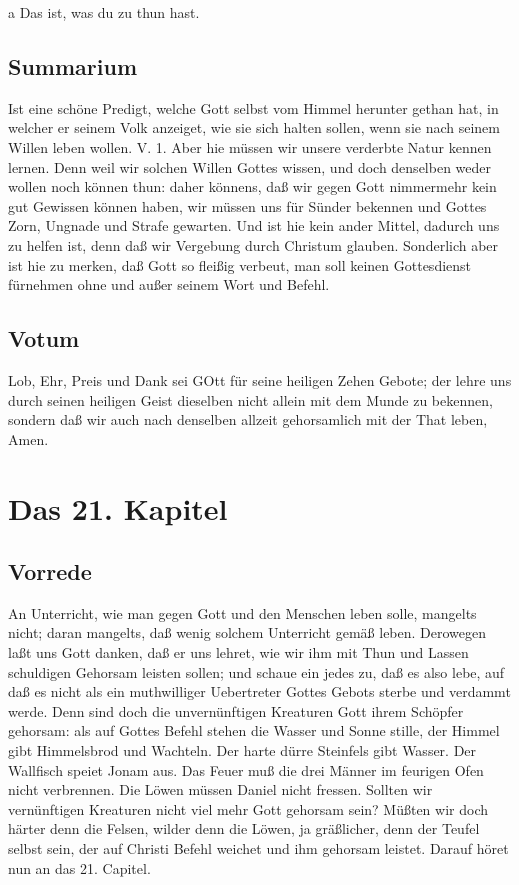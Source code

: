 a Das ist, was du zu thun hast.

\section{Summarium}

Ist eine schöne Predigt, welche Gott selbst vom Himmel herunter gethan hat, in welcher er seinem Volk anzeiget, wie sie sich halten sollen, wenn sie nach seinem Willen leben wollen. V. 1. Aber hie müssen wir unsere verderbte Natur kennen lernen. Denn weil wir solchen Willen Gottes wissen, und doch denselben weder wollen noch können thun: daher könnens, daß wir gegen
Gott nimmermehr kein gut Gewissen können haben, wir müssen uns für Sünder bekennen und Gottes Zorn, Ungnade und Strafe gewarten. Und ist hie kein ander Mittel, dadurch uns zu helfen ist, denn daß wir Vergebung durch Christum glauben. Sonderlich aber ist hie zu merken, daß Gott so fleißig verbeut, man soll keinen Gottesdienst fürnehmen ohne und außer seinem Wort und Befehl.

\section{Votum}

Lob, Ehr, Preis und Dank sei GOtt für seine heiligen Zehen Gebote; der lehre uns durch seinen heiligen Geist dieselben nicht allein mit dem Munde zu bekennen, sondern daß wir auch nach denselben allzeit gehorsamlich mit der That leben, Amen.

\chapter{Das 21. Kapitel}

\section{Vorrede}

An Unterricht, wie man gegen Gott und den Menschen leben solle, mangelts nicht; daran mangelts, daß wenig solchem Unterricht gemäß leben. Derowegen laßt uns Gott danken, daß er uns lehret, wie wir ihm mit Thun und Lassen schuldigen Gehorsam leisten sollen; und schaue ein jedes zu, daß es also lebe, auf daß es nicht als ein muthwilliger Uebertreter Gottes Gebots sterbe und verdammt werde. Denn sind doch die unvernünftigen Kreaturen Gott ihrem Schöpfer gehorsam: als auf Gottes Befehl stehen die Wasser und Sonne stille, der Himmel gibt Himmelsbrod und Wachteln. Der harte dürre Steinfels gibt Wasser. Der Wallfisch speiet Jonam aus. Das Feuer muß die drei Männer im feurigen Ofen nicht verbrennen. Die Löwen müssen Daniel nicht fressen. Sollten wir vernünftigen Kreaturen nicht viel mehr Gott gehorsam sein? Müßten wir doch härter denn die Felsen, wilder denn die Löwen, ja gräßlicher, denn der Teufel selbst sein, der auf Christi Befehl weichet und ihm gehorsam leistet. Darauf höret nun an das 21. Capitel.

